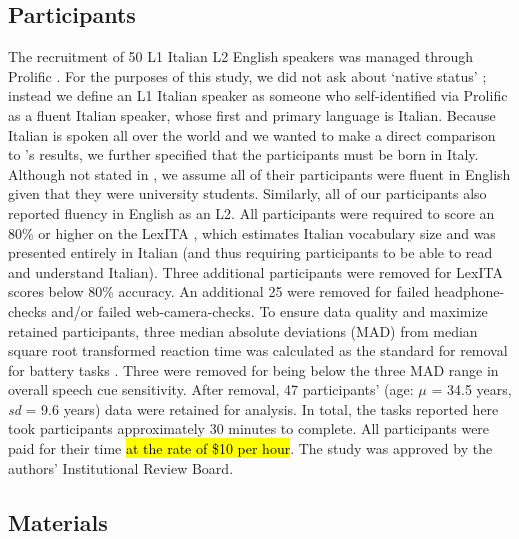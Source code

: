
\subsection{Participants}
The recruitment of 50 L1 Italian L2 English speakers was managed through Prolific \citep{Palan_2018}. For the purposes of this study, we did not ask about `native status' \citep{Brown_Tusmagambet_Rahming_Tu_DeSalvo_Wiener_2023}; instead we define an L1 Italian speaker as someone who self-identified via Prolific as a fluent Italian speaker, whose first and primary language is Italian. Because Italian is spoken all over the world and we wanted to make a direct comparison to \cite{Sulpizio_McQueen_2012}'s results, we further specified that the participants must be born in Italy. Although not stated in \cite{Sulpizio_McQueen_2012}, we assume all of their participants were fluent in English given that they were university students. Similarly, all of our participants also reported fluency in English as an L2. All participants were required to score an 80\% or higher on the LexITA \citep{Amenta2021}, which estimates Italian vocabulary size and was presented entirely in Italian (and thus requiring participants to be able to read and understand Italian). Three additional participants were removed for LexITA scores below 80\% accuracy. An additional 25 were removed for failed headphone-checks \citep{milne_2021} and/or failed web-camera-checks. To ensure data quality and maximize retained participants, three median absolute deviations (MAD) from median square root transformed reaction time was calculated as the standard for removal for battery tasks \citep{Leys_2013}. Three were removed for being below the three MAD \citep{Leys_2013} range in overall speech cue sensitivity. After removal, 47 participants' (age: $\mu$ = 34.5 years, \textit{sd} = 9.6 years) data were retained for analysis. In total, the tasks reported here took participants approximately 30 minutes to complete. All participants were paid for their time \hl{at the rate of \$10 per hour}. The study was approved by the authors' Institutional Review Board.

\subsection{Materials}

